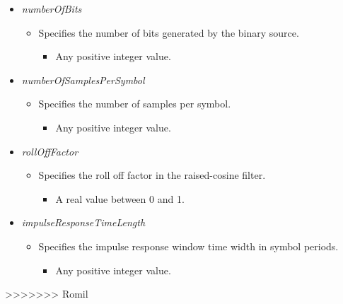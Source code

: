 \begin{itemize}
   \item  \emph{numberOfBits}
   \begin{itemize}
     \item  Specifies the number of bits generated by the binary source.
     \begin{itemize}
       \item Any positive integer value.
     \end{itemize}
   \end{itemize}

     \item  \emph{numberOfSamplesPerSymbol}
   \begin{itemize}
     \item  Specifies the number of samples per symbol.
     \begin{itemize}
       \item Any positive integer value.
     \end{itemize}
   \end{itemize}

   \item  \emph{rollOffFactor}
   \begin{itemize}
     \item  Specifies the roll off factor in the raised-cosine filter.
     \begin{itemize}
       \item A real value between 0 and 1.
     \end{itemize}
   \end{itemize}

      \item  \emph{impulseResponseTimeLength}
   \begin{itemize}
     \item  Specifies the impulse response window time width in symbol periods.
     \begin{itemize}
       \item Any positive integer value.
     \end{itemize}
   \end{itemize}

 \end{itemize}

>>>>>>> Romil
